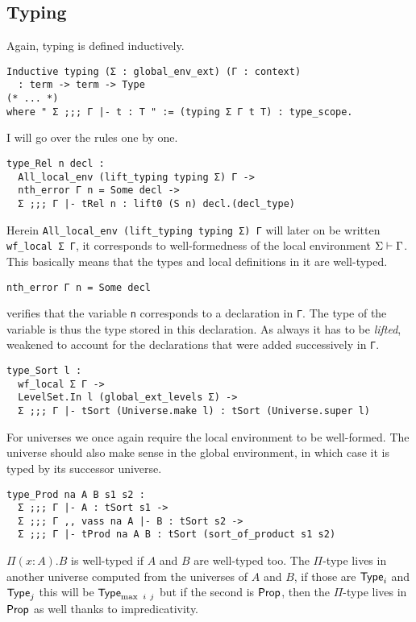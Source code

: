 \subsection{Typing}

Again, typing is defined inductively.
\begin{verbatim}
Inductive typing (Σ : global_env_ext) (Γ : context)
  : term -> term -> Type
(* ... *)
where " Σ ;;; Γ |- t : T " := (typing Σ Γ t T) : type_scope.
\end{verbatim}
I will go over the rules one by one.

\begin{verbatim}
type_Rel n decl :
  All_local_env (lift_typing typing Σ) Γ ->
  nth_error Γ n = Some decl ->
  Σ ;;; Γ |- tRel n : lift0 (S n) decl.(decl_type)
\end{verbatim}
Herein \texttt{All_local_env (lift_typing typing Σ) Γ} will later on
be written \texttt{wf_local Σ Γ}, it corresponds to well-formedness
of the local environment \(\Sigma \vdash \Gamma\). This basically means that
the types and local definitions in it are well-typed.
\begin{verbatim}
nth_error Γ n = Some decl
\end{verbatim}
verifies that the variable
\texttt{n} corresponds to a declaration in \texttt{Γ}.
The type of the variable is thus the type stored in this declaration. As always
it has to be \emph{lifted}, \ie weakened to account for the declarations
that were added successively in \texttt{Γ}.

\begin{verbatim}
type_Sort l :
  wf_local Σ Γ ->
  LevelSet.In l (global_ext_levels Σ) ->
  Σ ;;; Γ |- tSort (Universe.make l) : tSort (Universe.super l)
\end{verbatim}
For universes we once again require the local environment to be well-formed.
The universe should also make sense in the global environment, in which case it
is typed by its successor universe.

\begin{verbatim}
type_Prod na A B s1 s2 :
  Σ ;;; Γ |- A : tSort s1 ->
  Σ ;;; Γ ,, vass na A |- B : tSort s2 ->
  Σ ;;; Γ |- tProd na A B : tSort (sort_of_product s1 s2)
\end{verbatim}
\(\Pi (x:A).B\) is well-typed if \(A\) and \(B\) are well-typed too.
The \(\Pi\)-type lives in another universe computed from the universes of
\(A\) and \(B\), if those are \(\mathsf{Type}_i\) and \(\mathsf{Type}_j\) this will be
\(\mathsf{Type}_{\max\ i\ j}\) but if the second is \(\mathsf{Prop}\), then the \(\Pi\)-type
lives in \(\mathsf{Prop}\) as well thanks to impredicativity.


